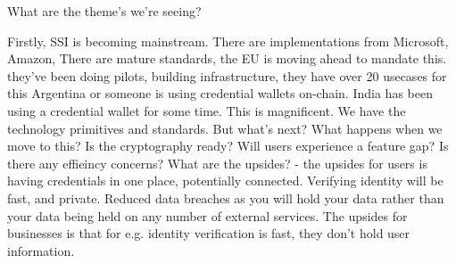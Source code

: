 

















What are the theme's we're seeing? 

Firstly, SSI is becoming mainstream. There are implementations from Microsoft, Amazon, 
There are mature standards, the EU is moving ahead to mandate this. they've been doing pilots, building infrastructure, they have over 20 usecases for this
Argentina or someone is using credential wallets on-chain. India has been using a credential wallet for some time. 
This is magnificent. We have the technology primitives and standards.
But what's next? What happens when we move to this? 
Is the cryptography ready? 
Will users experience a feature gap? Is there any effieincy concerns? 
What are the upsides? - the upsides for users is having credentials in one place, potentially connected. Verifying identity will be fast, and private. Reduced data breaches as you will hold your data rather than your data being held on any number of external services. The upsides for businesses is that for e.g. identity verification is fast, they don't hold user information. 


